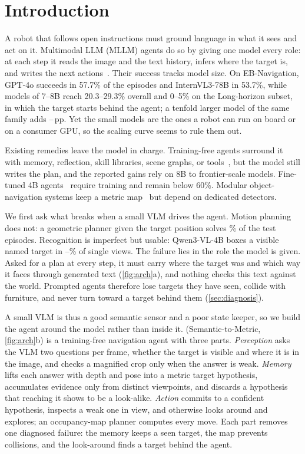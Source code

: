 \section{Introduction}
\label{sec:intro}

A robot that follows open instructions must ground language in what it sees and act on it. Multimodal LLM (MLLM)
agents do so by giving one model every role: at each step it reads the image and the text history, infers where
the target is, and writes the next actions~\cite{yang2025embodiedbench}. Their success tracks model size. On
EB-Navigation, GPT-4o succeeds in 57.7\% of the episodes and InternVL3-78B in 53.7\%, while models of 7--8B reach
20.3--29.3\% overall and 0--5\% on the Long-horizon subset, in which the target starts behind the agent; a tenfold
larger model of the same family adds \nScaleQwen--\nScaleIntern\,pp. Yet the small models are the ones a robot can
run on board or on a consumer GPU, so the scaling curve seems to rule them out.

Existing remedies leave the model in charge. Training-free agents surround it with memory, reflection, skill
libraries, scene graphs, or tools~\cite{lee2026emho,ma2026brainmem,zhou2026enabling,huang2025esca,ju2026embodiskill},
but the model still writes the plan, and the reported gains rely on 8B to frontier-scale models. Fine-tuned 4B
agents~\cite{xie2026sva,jang2026musix} require training and remain below 60\%. Modular object-navigation systems keep
a metric map~\cite{gadre2022cows,yokoyama2023vlfm,yin2024online} but depend on dedicated detectors.



We first ask what breaks when a small VLM drives the agent. Motion planning does not: a geometric planner given the
target position solves \nOracle\% of the test episodes. Recognition is imperfect but usable: Qwen3-VL-4B boxes a
visible named target in \nProbeThreeCommon--\nProbeThreeBase\% of single views. The failure lies in the role the model is
given. Asked for a plan at every step, it must carry where the target was and which way it faces through generated
text (\cref{fig:arch}a), and nothing checks this text against the world. Prompted agents therefore lose targets
they have seen, collide with furniture, and never turn toward a target behind them (\cref{sec:diagnosis}).

A small VLM is thus a good semantic sensor and a poor state keeper, so we build the agent around the model rather
than inside it. \ours (Semantic-to-Metric, \cref{fig:arch}b) is a training-free navigation agent with three parts.
\emph{Perception} asks the VLM two questions per frame, whether the target is visible and where it is in the image,
and checks a magnified crop only when the answer is weak. \emph{Memory} lifts each answer with depth and pose into
a metric target hypothesis, accumulates evidence only from distinct viewpoints, and discards a hypothesis that
reaching it shows to be a look-alike. \emph{Action} commits to a confident hypothesis, inspects a weak one in view,
and otherwise looks around and explores; an occupancy-map planner computes every move. Each part
removes one diagnosed failure: the memory keeps a seen target, the map prevents collisions, and the look-around
finds a target behind the agent.

